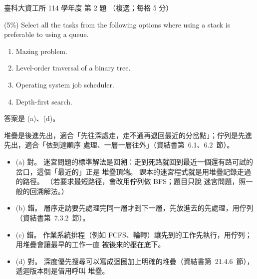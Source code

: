 \begin{pastexam}[label={px:ntust-114-ice-02}]{臺科大資工所 114 學年度 第 2 題}
（複選；每格 5 分）

(5\%) Select all the tasks from the following options where using a stack is preferable to using a
queue.
\begin{enumerate}[label=(\alph*)]
\item Mazing problem.
\item Level-order traversal of a binary tree.
\item Operating system job scheduler.
\item Depth-first search.
\end{enumerate}
\end{pastexam}

\begin{pastsoln}
答案是 (a)、(d)。

堆疊是後進先出，適合「先往深處走，走不通再退回最近的分岔點」；佇列是先進先出，適合「依到達順序
處理、一層一層往外」（資結書第~6.1、6.2~節）。
\begin{itemize}
\item (a) 對。 迷宮問題的標準解法是回溯：走到死路就回到最近一個還有路可試的岔口，這個「最近的」正是
堆疊頂端。 課本的迷宮程式就是用堆疊記錄走過的路徑。 （若要求最短路徑，會改用佇列做 BFS；題目只說
迷宮問題，照一般的回溯解法。）
\item (b) 錯。 層序走訪要先處理完同一層才到下一層，先放進去的先處理，用佇列（資結書第~7.3.2~節）。
\item (c) 錯。 作業系統排程（例如 FCFS、輪轉）讓先到的工作先執行，用佇列；用堆疊會讓最早的工作一直
被後來的壓在底下。
\item (d) 對。 深度優先搜尋可以寫成迴圈加上明確的堆疊（資結書第~21.4.6~節），遞迴版本則是借用呼叫
堆疊。
\end{itemize}
\end{pastsoln}
